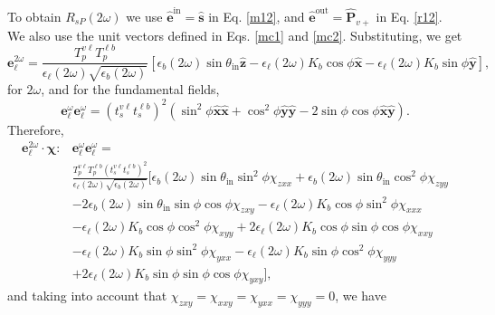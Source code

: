 To obtain $R_{sP}(2\omega)$ we use $\hat{\mathbf{e}}^{\mathrm{in}}=\hat{\mathbf{s}}$
in Eq. \eqref{m12}, and $\hat{\mathbf{e}}^{\mathrm{out}}=\hat{\mathbf{P}}_{v+}$ in
Eq. \eqref{r12}. We also use the unit vectors defined in Eqs. \eqref{mc1} and
\eqref{mc2}. Substituting, we get
\begin{equation*}
\mathbf{e}^{2\omega}_{\ell} 
= \frac{T^{v\ell}_{p}T^{\ell b}_{p}}
       {\epsilon_{\ell}(2\omega)\sqrt{\epsilon_{b}(2\omega)}}
\left[
  \epsilon_{b}(2\omega)\sin\theta_{\mathrm{in}}\hat{\mathbf{z}} 
- \epsilon_{\ell}(2\omega)K_{b}\cos\phi\hat{\mathbf{x}} 
- \epsilon_{\ell}(2\omega)K_{b}\sin\phi\hat{\mathbf{y}}
\right],
\end{equation*}
for $2\omega$, and for the fundamental fields,
\begin{equation*}
\mathbf{e}^{\omega}_{\ell}\mathbf{e}^{\omega}_{\ell}
= \left(t^{v\ell}_{s}t^{\ell b}_{s}\right)^{2}
\left(
  \sin^{2}\phi\hat{\mathbf{x}}\hat{\mathbf{x}}
+ \cos^{2}\phi\hat{\mathbf{y}}\hat{\mathbf{y}} 
- 2\sin\phi\cos\phi\hat{\mathbf{x}}\hat{\mathbf{y}}
\right).
\end{equation*}
Therefore,
\begin{equation*}
\begin{split}
\mathbf{e}^{2\omega}_{\ell}
\cdot\boldsymbol{\chi}:&
\mathbf{e}^{\omega}_{\ell}\mathbf{e}^{\omega}_{\ell} =\\
&\frac{T^{v\ell}_{p}T^{\ell b}_{p}\left(t^{v\ell}_{s}t^{\ell b}_{s}\right)^{2}}
      {\epsilon_{\ell}(2\omega)\sqrt{\epsilon_{b}(2\omega)}}
\big[
   \epsilon_{b}(2\omega)\sin\theta_{\mathrm{in}}\sin^{2}\phi\chi_{zxx} 
 + \epsilon_{b}(2\omega)\sin\theta_{\mathrm{in}}\cos^{2}\phi\chi_{zyy}\\
&- 2\epsilon_{b}(2\omega)\sin\theta_{\mathrm{in}}\sin\phi\cos\phi\chi_{zxy}
 - \epsilon_{\ell}(2\omega)K_{b}\cos\phi\sin^{2}\phi\chi_{xxx}\\
&- \epsilon_{\ell}(2\omega)K_{b}\cos\phi\cos^{2}\phi\chi_{xyy}
 + 2\epsilon_{\ell}(2\omega)K_{b}\cos\phi\sin\phi\cos\phi\chi_{xxy}\\
&- \epsilon_{\ell}(2\omega)K_{b}\sin\phi\sin^{2}\phi\chi_{yxx}
 - \epsilon_{\ell}(2\omega)K_{b}\sin\phi\cos^{2}\phi\chi_{yyy}\\
&+ 2\epsilon_{\ell}(2\omega)K_{b}\sin\phi\sin\phi\cos\phi\chi_{yxy}
\big],
\end{split}
\end{equation*}
and taking into account that $\chi_{zxy} = \chi_{xxy} = \chi_{yxx} = \chi_{yyy}
= 0$, we have
